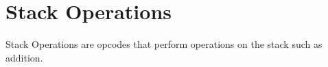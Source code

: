 \chapter{Stack Operations}

Stack Operations are opcodes that perform operations on the stack such as addition.

